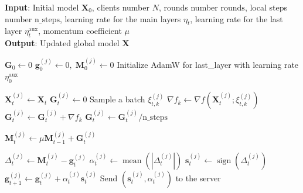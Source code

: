 \documentclass[letterpaper]{article} %
\begin{document}
\begin{algorithm}[!t]
\caption{Federated EF21-MuonUSign}
\label{ef21_alg}
\textbf{Input}: Initial model $\mathbf{X}_0$, clients number $N$, rounds number $\mathrm{rounds}$, local steps number $\mathrm{n\_steps}$, learning rate for the main layers $\eta_t$, learning rate for the last layer $\eta_t^{\text{aux}}$,  momentum coefficient $\mu$ \\
\textbf{Output}: Updated global model $\mathbf{X}$
\begin{algorithmic}[1]
\State $\mathbf{G}_0 \gets 0$ 
    \State $\mathbf{g}_0^{(j)} \gets 0, \; \mathbf{M}_0^{(j)} \gets 0$ 
\EndFor
\State Initialize AdamW for last\_layer with learning rate $\eta^{\mathrm{aux}}_0$

     
        \State $\mathbf{X}_t^{(j)} \gets \mathbf{X}_t$ 
        \State $\mathbf{G}_t^{(j)} \gets 0$
            \State Sample a batch $\xi_{t,k}^{(j)}$
            \State $\nabla f_k \gets \nabla f(\mathbf{X}_t^{(j)}; \xi_{t,k}^{(j)})$
            \State $\mathbf{G}_t^{(j)} \gets \mathbf{G}_t^{(j)} + \nabla f_k$
        \EndFor
        \State $\mathbf{G}_t^{(j)} \gets \mathbf{G}_t^{(j)} / \mathrm{n\_steps}$ 
        
        \State $\mathbf{M}_t^{(j)} \gets \mu \mathbf{M}_{t-1}^{(j)} + \mathbf{G}_t^{(j)}$ 
        
            \State $\Delta_t^{(j)} \gets \mathbf{M}_t^{(j)} - \mathbf{g}_t^{(j)}$ 
            \State $\alpha_t^{(j)} \gets \operatorname{mean}(|\Delta_t^{(j)}|)$ 
            \State $\mathbf{s}_t^{(j)} \gets \operatorname{sign}(\Delta_t^{(j)})$ 
            \State $\mathbf{g}_{t+1}^{(j)} \gets \mathbf{g}_t^{(j)} + \alpha_t^{(j)} \mathbf{s}_t^{(j)}$ 
            \State Send $(\mathbf{s}_t^{(j)}, \alpha_t^{(j)})$ to the server
        \EndFor
        

\end{algorithmic}
\end{algorithm}
\end{document}
